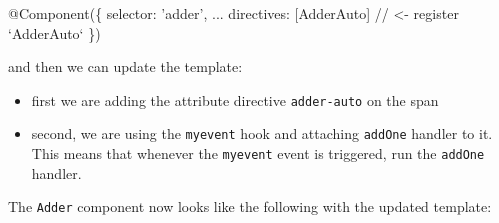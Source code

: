 \documentclass[12pt,]{article}
\newenvironment{Shaded}{}{}
\newcommand{\KeywordTok}[1]{\textcolor[rgb]{0.00,0.00,1.00}{{#1}}}
\newcommand{\StringTok}[1]{\textcolor[rgb]{0.00,0.50,0.50}{{#1}}}
\newcommand{\CommentTok}[1]{\textcolor[rgb]{0.00,0.50,0.00}{{#1}}}
\newcommand{\OtherTok}[1]{\textcolor[rgb]{1.00,0.25,0.00}{{#1}}}
\newcommand{\FunctionTok}[1]{{#1}}
\newcommand{\ErrorTok}[1]{\textcolor[rgb]{1.00,0.00,0.00}{\textbf{{#1}}}}
\newcommand{\NormalTok}[1]{{#1}}
\providecommand{\tightlist}{%
  \setlength{\itemsep}{0pt}\setlength{\parskip}{0pt}}
\begin{document}
\begin{Shaded}
\begin{Highlighting}[numbers=left,,]
\FunctionTok{@Component}\NormalTok{(\{}
  \NormalTok{selector: 'adder',}
  \NormalTok{...}
  \NormalTok{directives: [AdderAuto] }\CommentTok{// <- register `AdderAuto`}
\NormalTok{\})}
\end{Highlighting}
\end{Shaded}

and then we can update the template:

\begin{Shaded}
\end{Shaded}

\begin{itemize}
\tightlist
\item
  first we are adding the attribute directive \texttt{adder-auto} on the
  span
\item
  second, we are using the \texttt{myevent} hook and attaching
  \texttt{addOne} handler to it. This means that whenever the
  \texttt{myevent} event is triggered, run the \texttt{addOne} handler.
\end{itemize}

The \texttt{Adder} component now looks like the following with the
updated template:

\begin{Shaded}
\end{Shaded}
\end{document}
